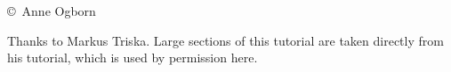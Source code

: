 \secdown
{}
\copyright\ Anne Ogborn 
\bigskip

Thanks to Markus Triska. Large sections of this tutorial are taken directly from
his tutorial, which is used by permission here.











\secup
